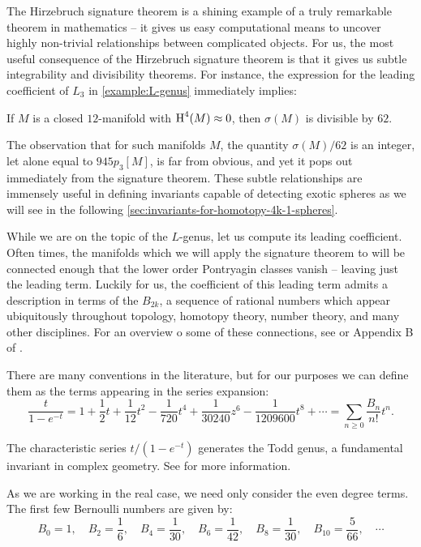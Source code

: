 The Hirzebruch signature theorem is a shining example of a truly remarkable theorem in mathematics -- it gives us easy computational means to uncover highly non-trivial relationships between complicated objects. For us, the most useful consequence of the Hirzebruch signature theorem is that it gives us subtle integrability and divisibility theorems. For instance, the expression for the leading coefficient of $L_3$ in \cref{example:L-genus} immediately implies:
\begin{corollary}
	If $M$ is a closed $12$-manifold with $\operatorname{H}^4(M)\approx 0$, then $\sigma(M)$ is divisible by $62$.
\end{corollary}
The observation that for such manifolds $M$, the quantity $\sigma(M)/62$ is an integer, let alone equal to $945p_3[M]$, is far from obvious, and yet it pops out immediately from the signature theorem. These subtle relationships are immensely useful in defining invariants capable of detecting exotic spheres as we will see in the following \cref{sec:invariants-for-homotopy-4k-1-spheres}.

While we are on the topic of the $L$-genus, let us compute its leading coefficient. Often times, the manifolds which we will apply the signature theorem to will be connected enough that the lower order Pontryagin classes vanish -- leaving just the leading term.
Luckily for us, the coefficient of this leading term admits a description in terms of the  $B_{2k}$, a sequence of rational numbers which appear ubiquitously throughout topology, homotopy theory, number theory, and many other disciplines. For an overview o some of these connections, see \cite{mazurbernoulli} or Appendix B of \cite{milnorstasheff1974}.

There are many conventions in the literature, but for our purposes we can define them as the terms appearing in the series expansion:
\[
	\frac{t}{1-e^{-t}} =  1+\frac{1}{2}t + \frac{1}{12}t^2-\frac{1}{720}t^4+\frac{1}{30240}z^6-\frac{1}{1209600}t^8+\cdots=\sum_{n\geq 0}\frac{B_n}{n!}t^n.
\]
\begin{remark}
	The characteristic series $t/(1-e^{-t})$ generates the Todd genus, a fundamental invariant in complex geometry. See \cite{hirzebruch1966methods} for more information.
\end{remark}
As we are working in the real case, we need only consider the even degree terms. The first few Bernoulli numbers are given by:
\begin{equation}\label{eq:bernoulli_numbers}
	B_0 = 1,\quad B_2 = \frac{1}{6},\quad B_4 = \frac{1}{30},\quad B_6=\frac{1}{42},\quad B_{8}=\frac{1}{30},\quad B_{10} = \frac{5}{66},\quad\cdots
\end{equation}

